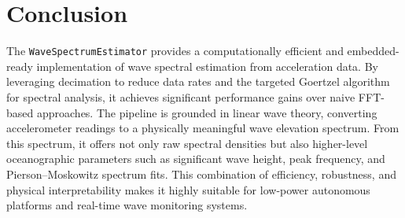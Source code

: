 \documentclass[11pt,letterpaper]{article}
\begin{document}
\section{Conclusion}
The \texttt{WaveSpectrumEstimator} provides a computationally efficient and embedded-ready implementation of wave spectral estimation from acceleration data. By leveraging decimation to reduce data rates and the targeted Goertzel algorithm for spectral analysis, it achieves significant performance gains over naive FFT-based approaches. The pipeline is grounded in linear wave theory, converting accelerometer readings to a physically meaningful wave elevation spectrum. From this spectrum, it offers not only raw spectral densities but also higher-level oceanographic parameters such as significant wave height, peak frequency, and Pierson--Moskowitz spectrum fits. This combination of efficiency, robustness, and physical interpretability makes it highly suitable for low-power autonomous platforms and real-time wave monitoring systems.

%
%
\end{document}
